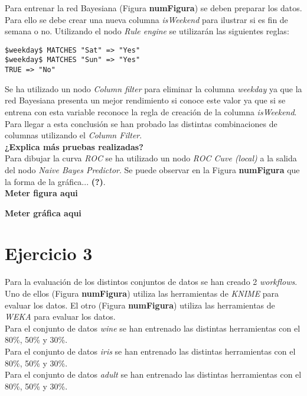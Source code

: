 \documentclass[10pt,a4paper]{article}
\begin{document}
Para entrenar la red Bayesiana (Figura \textbf{numFigura}) se deben preparar los datos. Para ello se debe crear una nueva columna \emph{isWeekend} para ilustrar si es fin de semana o no. Utilizando el nodo \emph{Rule engine} se utilizarán las siguientes reglas:

\begin{lstlisting}
$weekday$ MATCHES "Sat" => "Yes"
$weekday$ MATCHES "Sun" => "Yes"
TRUE => "No"
\end{lstlisting}

Se ha utilizado un nodo \emph{Column filter} para eliminar la columna \emph{weekday} ya que la red Bayesiana presenta un mejor rendimiento si conoce este valor ya que si se entrena con esta variable reconoce la regla de creación de la columna \emph{isWeekend}.\\
Para llegar a esta conclusión se han probado las distintas combinaciones de columnas utilizando el \emph{Column Filter}.\\
\textbf{¿Explica más pruebas realizadas?}\\

Para dibujar la curva \emph{ROC} se ha utilizado un nodo \emph{ROC Cuve (local)} a la salida del nodo \emph{Naive Bayes Predictor}. Se puede observar en la Figura \textbf{numFigura} que la forma de la gráfica... \textbf{(?)}.\\


{\Huge \textbf{Meter figura aqui}}

{\Huge \textbf{Meter gráfica aqui}}


\section{Ejercicio 3}

Para la evaluación de los distintos conjuntos de datos se han creado 2 \emph{workflows}. Uno de ellos (Figura \textbf{numFigura}) utiliza las herramientas de \emph{KNIME} para evaluar los datos. El otro (Figura \textbf{numFigura}) utiliza las herramientas de \emph{WEKA} para evaluar los datos.\\

Para el conjunto de datos \emph{wine} se han entrenado las distintas herramientas con el 80\%, 50\% y 30\%.\\
Para el conjunto de datos \emph{iris} se han entrenado las distintas herramientas con el 80\%, 50\% y 30\%.\\
Para el conjunto de datos \emph{adult} se han entrenado las distintas herramientas con el 80\%, 50\% y 30\%.\\
\end{document}
